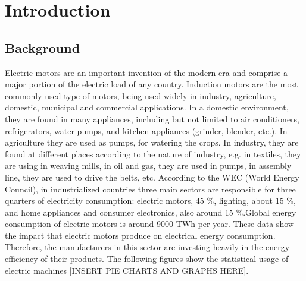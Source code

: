 \chapter{Introduction} %
\label{Chapter1}

\section{Background}

Electric motors are an important invention of the modern era and comprise a major portion of the electric load of any country. Induction motors are the most commonly used type of motors, being used widely in industry, agriculture, domestic, municipal and commercial applications. In a domestic environment, they are found in many appliances, including but not limited to air conditioners, refrigerators, water pumps, and kitchen appliances (grinder, blender, etc.). In agriculture they are used as pumps, for watering the crops. In industry, they are found at different places according to the nature of industry, e.g. in textiles, they are using in weaving mills, in oil and gas, they are used in pumps, in assembly line, they are used to drive the belts, etc. According to the WEC (World Energy Council), in industrialized countries three main sectors are responsible for three quarters of electricity consumption: electric motors, 45 \%, lighting, about 15 \%, and home appliances and consumer electronics, also around 15 \%.Global energy consumption of electric motors is around 9000 TWh per year. These data show the impact that electric motors produce on electrical energy consumption. Therefore, the manufacturers in this sector are investing heavily in the energy efficiency of their products. The following figures show the statistical usage of electric machines [INSERT PIE CHARTS AND GRAPHS HERE].

